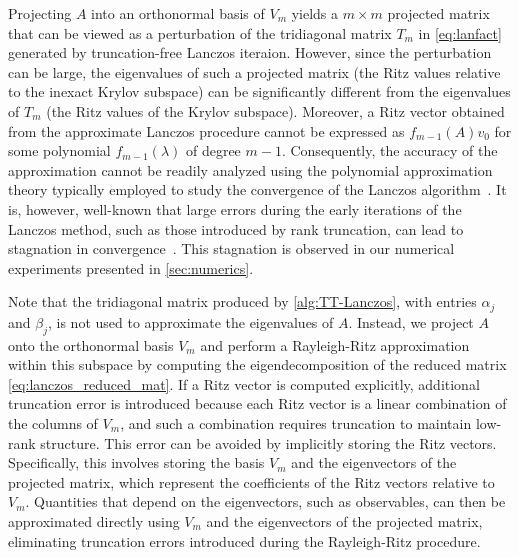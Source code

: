 \documentclass[10pt,preprint]{elsarticle}
\begin{document}
\begin{appendices}
Projecting $A$ into an orthonormal basis of $V_m$ yields a $m \times m$ projected matrix that can be 
viewed as a perturbation of the tridiagonal matrix $T_m$ in \eqref{eq:lanfact} generated by truncation-free Lanczos iteraion. However, since the perturbation can be large, the eigenvalues of such a projected matrix (the Ritz values relative to the inexact Krylov subspace) can be significantly different from the eigenvalues of $T_m$ (the Ritz values of the Krylov subspace). Moreover, a Ritz vector obtained from the approximate Lanczos procedure cannot be expressed as $f_{m-1}(A)v_0$ for some polynomial $f_{m-1}(\lambda)$ of degree $m-1$. Consequently, the accuracy of the approximation cannot be readily analyzed using the polynomial approximation theory typically employed to study the convergence of the Lanczos algorithm~\cite{parlett}. It is, however, well-known that large errors during the early iterations of the Lanczos method, such as those introduced by rank truncation, can lead to stagnation in convergence~\cite{PAIGE1980235}. This stagnation is observed in our numerical experiments presented in \cref{sec:numerics}. 

Note that the tridiagonal matrix produced by \cref{alg:TT-Lanczos}, with entries $\alpha_j$ and $\beta_j$, is not used to approximate the eigenvalues of $A$. Instead, we project $A$ onto the orthonormal basis ${V}_m$ and perform a Rayleigh-Ritz approximation within this subspace by computing the eigendecomposition of the reduced matrix \eqref{eq:lanczos_reduced_mat}. If a Ritz vector is computed explicitly, additional truncation error is introduced because each Ritz vector is a linear combination of the columns of $V_m$, and such a combination requires truncation to maintain low-rank structure. This error can be avoided by implicitly storing the Ritz vectors. Specifically, this involves storing the basis $V_m$ and the eigenvectors of the projected matrix, which represent the coefficients of the Ritz vectors relative to $V_m$. Quantities that depend on the eigenvectors, such as observables, can then be approximated directly using $V_m$ and the eigenvectors of the projected matrix, eliminating truncation errors introduced during the Rayleigh-Ritz procedure. 



\end{appendices}
\end{document}
